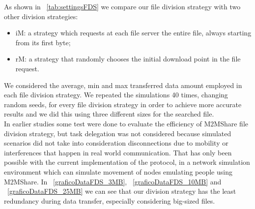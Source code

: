 As shown in \tablename~\ref{tab:settingsFDS} we compare our file division strategy with two other division strategies:
\begin{itemize}
\item iM: a strategy which requests at each file server the entire file, always starting from its first byte;
\item rM: a strategy that randomly chooses the initial download point in the file request.
\end{itemize}

We considered the average, min and max transferred data amount employed in each file division strategy. We repeated the simulations 40 times, changing random seeds, for every file division strategy in order to achieve more accurate results and we did this using three different sizes for the searched file. 
\\
In earlier studies some test were done to evaluate the efficiency of M2MShare file division strategy, but task delegation was not considered because simulated scenarios did not take into consideration disconnections due to mobility or interferences that happen in real world
communication. That has only been possible with the current implementation of the protocol, in a network simulation environment which can simulate movement of nodes emulating people using M2MShare.
In \figurename~\ref{graficoDataFDS_3MB}, \figurename~\ref{graficoDataFDS_10MB} and \figurename~\ref{graficoDataFDS_25MB} we can see that our division strategy has the least redundancy during data transfer, especially considering big-sized files.

